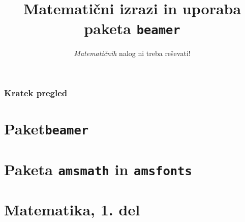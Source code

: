 \documentclass{beamer}
\title{Matematični izrazi in uporaba paketa \texttt{beamer}}
\subtitle{\emph{Matematičnih} nalog ni treba reševati!}
\institute{Fakulteta za matematiko in fiziko}
\date{}
\begin{document}
\frame{\titlepage}

\begin{frame}
    \frametitle{Kratek pregled}
    \tableofcontents %
\end{frame}





\section{Paket\texttt{beamer}}
\begin{frame}

\end{frame}

\section{Paketa \texttt{amsmath} in \texttt{amsfonts}}

\begin{frame}
    
\end{frame}

\section[Matematika, 1. del\\\large{Analiza, logika, množice}]{Matematika, 1. del}
\begin{frame}
    
\end{frame}
\end{document}

